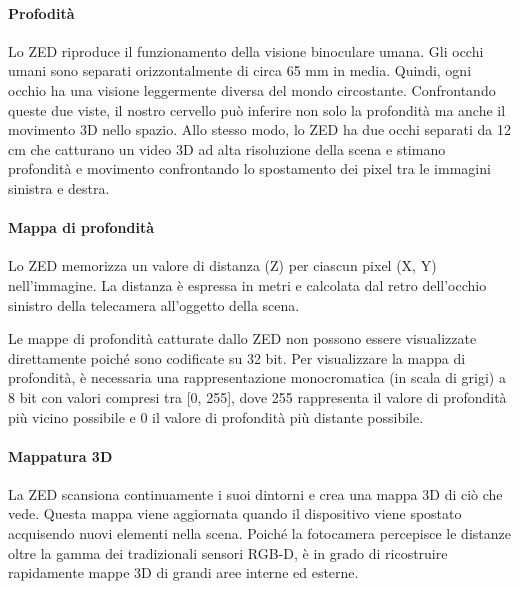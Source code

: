 \documentclass[a4paper]{article}
\begin{document}
\paragraph{Profodità}
Lo ZED riproduce il funzionamento della visione binoculare umana. Gli occhi umani sono separati orizzontalmente di circa 65 mm in media. Quindi, ogni occhio ha una visione leggermente diversa del mondo circostante. Confrontando queste due viste, il nostro cervello può inferire non solo la profondità ma anche il movimento 3D nello spazio. Allo stesso modo, lo ZED ha due occhi separati da 12 cm che catturano un video 3D ad alta risoluzione della scena e stimano profondità e movimento confrontando lo spostamento dei pixel tra le immagini sinistra e destra.
\paragraph{Mappa di profondità}
Lo ZED memorizza un valore di distanza (Z) per ciascun pixel (X, Y) nell'immagine. La distanza è espressa in  metri e calcolata dal retro dell'occhio sinistro della telecamera all'oggetto della scena.

Le mappe di profondità catturate dallo ZED non possono essere visualizzate direttamente poiché sono codificate su 32 bit. Per visualizzare la mappa di profondità, è necessaria una rappresentazione monocromatica (in scala di grigi) a 8 bit con valori compresi tra [0, 255], dove 255 rappresenta il valore di profondità più vicino possibile e 0 il valore di profondità più distante possibile.
\paragraph{Mappatura 3D}
La ZED scansiona continuamente i suoi dintorni e crea una mappa 3D di ciò che vede. Questa mappa viene aggiornata quando il dispositivo viene spostato acquisendo nuovi elementi nella scena. Poiché la fotocamera percepisce le distanze oltre la gamma dei tradizionali sensori RGB-D, è in grado di ricostruire rapidamente mappe 3D di grandi aree interne ed esterne.
\end{document}
